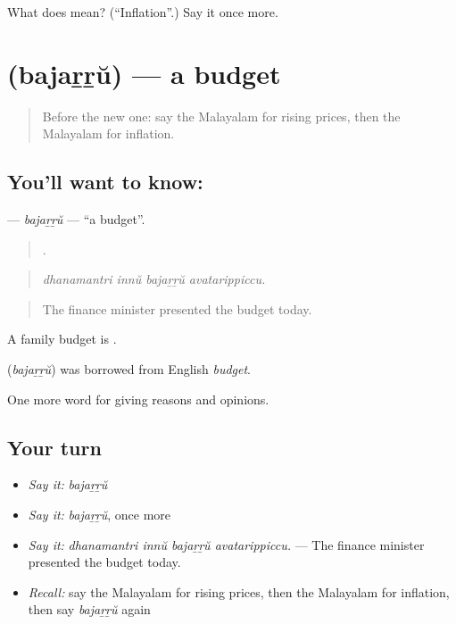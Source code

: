 \begin{tcolorbox}[breakable,colback=teal!4,colframe=teal!35!black,title={Before you move on}]
What does  mean? (\textquotedblleft{}Inflation\textquotedblright{}.) Say it once more.
\end{tcolorbox}
\section[\texorpdfstring{\ml{ബജറ്റ്} (bajaṟṟŭ)}{ബജറ്റ് (bajaṟṟŭ)}]{ (bajaṟṟŭ) — a budget}

\label{lesson:ML-C428-bajarru}



\begin{quote}
Before the new one: say the Malayalam for rising prices, then the Malayalam for inflation.
\end{quote}

\subsection*{You'll want to know: }
\textbf{} — \emph{bajaṟṟŭ} — \textquotedblleft{}a budget\textquotedblright{}.

\begin{quote}
   .
\end{quote}

\begin{quote}
\emph{dhanamantri innŭ bajaṟṟŭ avatarippiccu.}
\end{quote}

\begin{quote}
The finance minister presented the budget today.
\end{quote}

A family budget is  .

\begin{cousinweb}
\textbf{} (\emph{bajaṟṟŭ}) was borrowed from English \emph{budget}.
\end{cousinweb}

\begin{grammarlens}[title={What you've built}]
One more word for giving reasons and opinions.
\end{grammarlens}

\subsection*{Your turn}
\begin{itemize}
\raggedright
  \item \emph{Say it:} \emph{bajaṟṟŭ}
  \item \emph{Say it:} \emph{bajaṟṟŭ}, once more
  \item \emph{Say it:} \emph{dhanamantri innŭ bajaṟṟŭ avatarippiccu.} — The finance minister presented the budget today.
  \item \emph{Recall:} say the Malayalam for rising prices, then the Malayalam for inflation, then say \emph{bajaṟṟŭ} again
\end{itemize}

